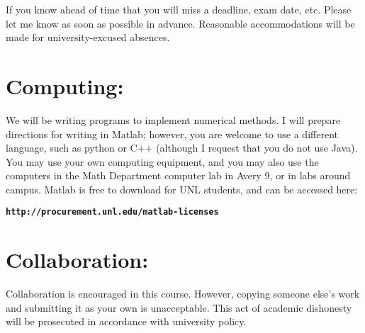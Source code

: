 \documentclass[margin]{res}
\theoremstyle{plain}
\theoremstyle{definition}
\theoremstyle{remark}
\begin{document}
\begin{resume}
If you know ahead of time that you will miss a deadline, exam date, etc. Please let me know as soon as possible in advance. Reasonable accommodations will be made for university-excused absences.


\section{Computing:}
We will be writing programs to implement numerical methods. I will prepare directions for writing in
Matlab; however, you are welcome to use a different language, such as python or C++ (although I request that you do not use Java). You may use your own computing equipment, and you may also use the computers in the Math Department computer lab in Avery 9, or in labs around campus.  Matlab is free to download for UNL students, and can be accessed here:

\texttt{\textbf{http://procurement.unl.edu/matlab-licenses}}

\section{Collaboration:} Collaboration is encouraged in this course. However, copying someone else's work and submitting it as your own is unacceptable.  This act of academic dishonesty will be prosecuted in accordance with university policy.



\end{resume}
\end{document}
